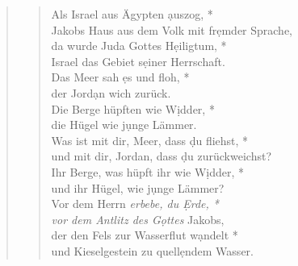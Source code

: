 
\begin{quote}
\begin{verse}
Als Israel aus Ägypten \d auszog, *\\
Jakobs Haus aus dem Volk mit fr\d emder Sprache, \\ 
\vin da wurde Juda Gottes H\d eiligtum, *\\ 
\vin Israel das Gebiet s\d einer Herrschaft.\\  
Das Meer sah \d es und floh, *\\
der Jord\d an wich zurück.\\ 
\vin Die Berge hüpften wie W\d idder, *\\ 
\vin die Hügel wie j\d unge Lämmer.\\  
Was ist mit dir, Meer, dass \d du fliehst, *\\
und mit dir, Jordan, dass \d du zurückweichst?\\ 
\vin Ihr Berge, was hüpft ihr wie W\d idder, *\\ 
\vin und ihr Hügel, wie j\d unge Lämmer?\\  
Vor dem Herrn \textit{erbebe, du \d Erde, *\\
vor dem Antlitz des G\d ottes} Jakobs,\\ 
\vin der den Fels zur Wasserflut w\d andelt *\\ 
\vin und Kieselgestein zu quell\d endem Wasser.\\  
\end{verse}
\end{quote}

\newpage

\def\greinitialformat#1{{\fontsize{40}{40}\selectfont #1}}
\gresetfirstlineaboveinitial{\small \textcolor{red}{Ps 115}}{}
\setaboveinitialseparation{0.72mm}


\vspace{0.3cm}


